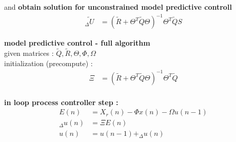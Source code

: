 \documentclass[12pt,twoside,onecolumn,openany,extrafontsizes,dvipsnames]{memoir}
\begin{document}
        and \textbf{obtain solution for unconstrained model predictive controll}
        \begin{align*}
          \tilde{_\Delta U} &= (\tilde{R} + \Theta^T\tilde{Q}\Theta)^{-1} \Theta^T\tilde{Q}S
        \end{align*} 

        \textbf{model predictive control - full algorithm} \\
        given matrices : $\tilde{Q}, \tilde{R}, \Theta, \Phi, \Omega$ \\
        initialization (precompute) :
        \begin{align*}
        \Xi &= (\tilde{R} + \Theta^T\tilde{Q}\Theta)^{-1} \Theta^T\tilde{Q} \\
        \end{align*}
        
        \textbf{in loop process controller step :}
        \begin{align*}
          E(n) &= X_r(n) - \Phi x(n) - \Omega u(n-1) \\
          _\Delta u(n) &= \Xi E(n) \\
          u(n) &= u(n-1) + _\Delta u(n)
        \end{align*}
      
      
\end{document}
